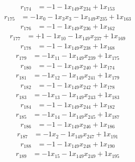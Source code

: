 \[\begin{aligned}
r_{174} &= - 1 - 1 x_{149} x_{234} + 1 x_{153}
\end{aligned}\]
\[\begin{aligned}
r_{175} &= - 1 x_{0} - 1 x_{3} x_{3} - 1 x_{149} x_{235} + 1 x_{163}
\end{aligned}\]
\[\begin{aligned}
r_{176} &= - 1 - 1 x_{149} x_{236} + 1 x_{162}
\end{aligned}\]
\[\begin{aligned}
r_{177} &= + 1 - 1 x_{10} - 1 x_{149} x_{237} + 1 x_{169}
\end{aligned}\]
\[\begin{aligned}
r_{178} &= - 1 - 1 x_{149} x_{238} + 1 x_{168}
\end{aligned}\]
\[\begin{aligned}
r_{179} &= - 1 x_{11} - 1 x_{149} x_{239} + 1 x_{175}
\end{aligned}\]
\[\begin{aligned}
r_{180} &= - 1 - 1 x_{149} x_{240} + 1 x_{174}
\end{aligned}\]
\[\begin{aligned}
r_{181} &= - 1 x_{12} - 1 x_{149} x_{241} + 1 x_{179}
\end{aligned}\]
\[\begin{aligned}
r_{182} &= - 1 - 1 x_{149} x_{242} + 1 x_{178}
\end{aligned}\]
\[\begin{aligned}
r_{183} &= - 1 x_{13} - 1 x_{149} x_{243} + 1 x_{183}
\end{aligned}\]
\[\begin{aligned}
r_{184} &= - 1 - 1 x_{149} x_{244} + 1 x_{182}
\end{aligned}\]
\[\begin{aligned}
r_{185} &= - 1 x_{14} - 1 x_{149} x_{245} + 1 x_{187}
\end{aligned}\]
\[\begin{aligned}
r_{186} &= - 1 - 1 x_{149} x_{246} + 1 x_{186}
\end{aligned}\]
\[\begin{aligned}
r_{187} &= - 1 x_{2} - 1 x_{149} x_{247} + 1 x_{191}
\end{aligned}\]
\[\begin{aligned}
r_{188} &= - 1 - 1 x_{149} x_{248} + 1 x_{190}
\end{aligned}\]
\[\begin{aligned}
r_{189} &= - 1 x_{15} - 1 x_{149} x_{249} + 1 x_{195}
\end{aligned}\]
